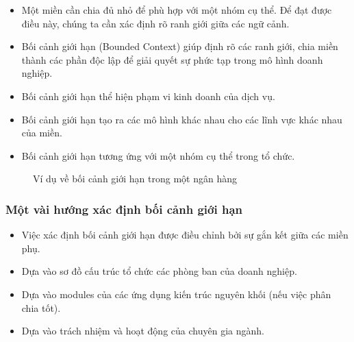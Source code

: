 \begin{itemize}

    \item Một miền cần chia đủ nhỏ để phù hợp với một nhóm cụ thể. Để đạt được điều này, chúng ta cần xác định rõ ranh giới giữa các ngữ cảnh.
    
    \item Bối cảnh giới hạn (Bounded Context) giúp định rõ các ranh giới, chia miền thành các phần độc lập để giải quyết sự phức tạp trong mô hình doanh nghiệp.
    
    \item Bối cảnh giới hạn thể hiện phạm vi kinh doanh của dịch vụ.
    
    \item Bối cảnh giới hạn tạo ra các mô hình khác nhau cho các lĩnh vực khác nhau của miền.
    
    \item Bối cảnh giới hạn tương ứng với một nhóm cụ thể trong tổ chức.
    
    \end{itemize}
    
    \begin{figure}[H]
    
    \centering
    
    
    \caption{Ví dụ về bối cảnh giới hạn trong một ngân hàng}
    
    \end{figure}
    
    \subsubsection{Một vài hướng xác định bối cảnh giới hạn}
    
    \begin{itemize}
    
    \item Việc xác định bối cảnh giới hạn được điều chỉnh bởi sự gắn kết giữa các miền phụ.
    
    \item Dựa vào sơ đồ cấu trúc tổ chức các phòng ban của doanh nghiệp.
    
    \item Dựa vào modules của các ứng dụng kiến trúc nguyên khối (nếu việc phân chia tốt).
    
    \item Dựa vào trách nhiệm và hoạt động của chuyên gia ngành.
    
    \end{itemize}
    
    
    
